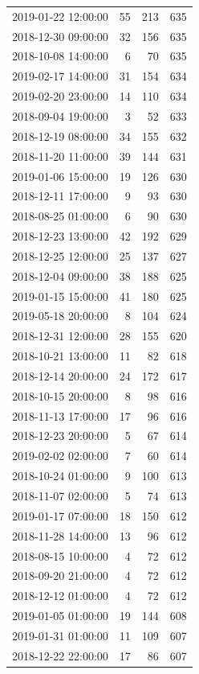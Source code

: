 \begin{tabular}{lrrr}
2019-01-22 12:00:00 & 55 & 213 & 635 \\
2018-12-30 09:00:00 & 32 & 156 & 635 \\
2018-10-08 14:00:00 & 6 & 70 & 635 \\
2019-02-17 14:00:00 & 31 & 154 & 634 \\
2019-02-20 23:00:00 & 14 & 110 & 634 \\
2018-09-04 19:00:00 & 3 & 52 & 633 \\
2018-12-19 08:00:00 & 34 & 155 & 632 \\
2018-11-20 11:00:00 & 39 & 144 & 631 \\
2019-01-06 15:00:00 & 19 & 126 & 630 \\
2018-12-11 17:00:00 & 9 & 93 & 630 \\
2018-08-25 01:00:00 & 6 & 90 & 630 \\
2018-12-23 13:00:00 & 42 & 192 & 629 \\
2018-12-25 12:00:00 & 25 & 137 & 627 \\
2018-12-04 09:00:00 & 38 & 188 & 625 \\
2019-01-15 15:00:00 & 41 & 180 & 625 \\
2019-05-18 20:00:00 & 8 & 104 & 624 \\
2018-12-31 12:00:00 & 28 & 155 & 620 \\
2018-10-21 13:00:00 & 11 & 82 & 618 \\
2018-12-14 20:00:00 & 24 & 172 & 617 \\
2018-10-15 20:00:00 & 8 & 98 & 616 \\
2018-11-13 17:00:00 & 17 & 96 & 616 \\
2018-12-23 20:00:00 & 5 & 67 & 614 \\
2019-02-02 02:00:00 & 7 & 60 & 614 \\
2018-10-24 01:00:00 & 9 & 100 & 613 \\
2018-11-07 02:00:00 & 5 & 74 & 613 \\
2019-01-17 07:00:00 & 18 & 150 & 612 \\
2018-11-28 14:00:00 & 13 & 96 & 612 \\
2018-08-15 10:00:00 & 4 & 72 & 612 \\
2018-09-20 21:00:00 & 4 & 72 & 612 \\
2018-12-12 01:00:00 & 4 & 72 & 612 \\
2019-01-05 01:00:00 & 19 & 144 & 608 \\
2019-01-31 01:00:00 & 11 & 109 & 607 \\
2018-12-22 22:00:00 & 17 & 86 & 607 \\

\end{tabular}
